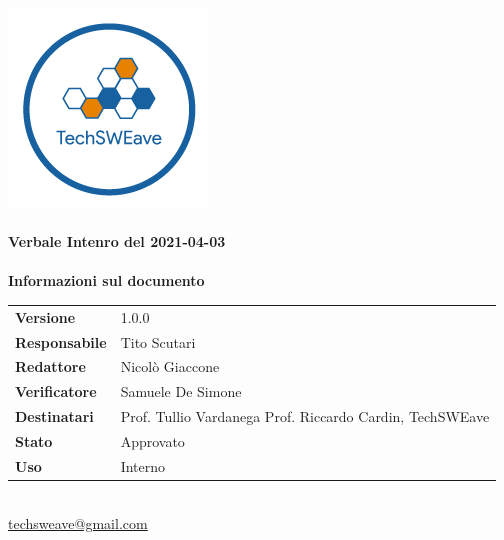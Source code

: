 \documentclass[a4paper]{article}
\begin{document}
\begin{titlepage}
    \begin{center}
        \includegraphics{../../../../Images/logo.png}\\
        \vspace{20px}
        \textcolor{logo}{\hrulefill}\\
        \vspace{20px}
        \textbf{\huge\textcolor{logo}{Verbale Intenro del 2021-04-03}}\\
        \vspace{10px}
        \textcolor{logo}{\hrulefill}\\
        \vspace{40px}
        \textbf{\Large Informazioni sul documento}\\
        \vspace{20px}
        \begin{tabular}{p{100px} | p{100px}}
            \textbf{Versione}     & 1.0.0                                                                      \\
            \textbf{Responsabile} & Tito Scutari                                                               \\
            \textbf{Redattore}    & Nicolò Giaccone                                                            \\
            \textbf{Verificatore} & Samuele De Simone                                                          \\
            \textbf{Destinatari}  & Prof. Tullio Vardanega \newline Prof. Riccardo Cardin, \newline TechSWEave \\
            \textbf{Stato}        & Approvato                                                                  \\
            \textbf{Uso}          & Interno                                                                    \\
        \end{tabular}\\
        \vspace{60px}
        \href{mailto:techsweave@gmail.com}{techsweave@gmail.com}\\

    \end{center}
\end{titlepage}
\end{document}
